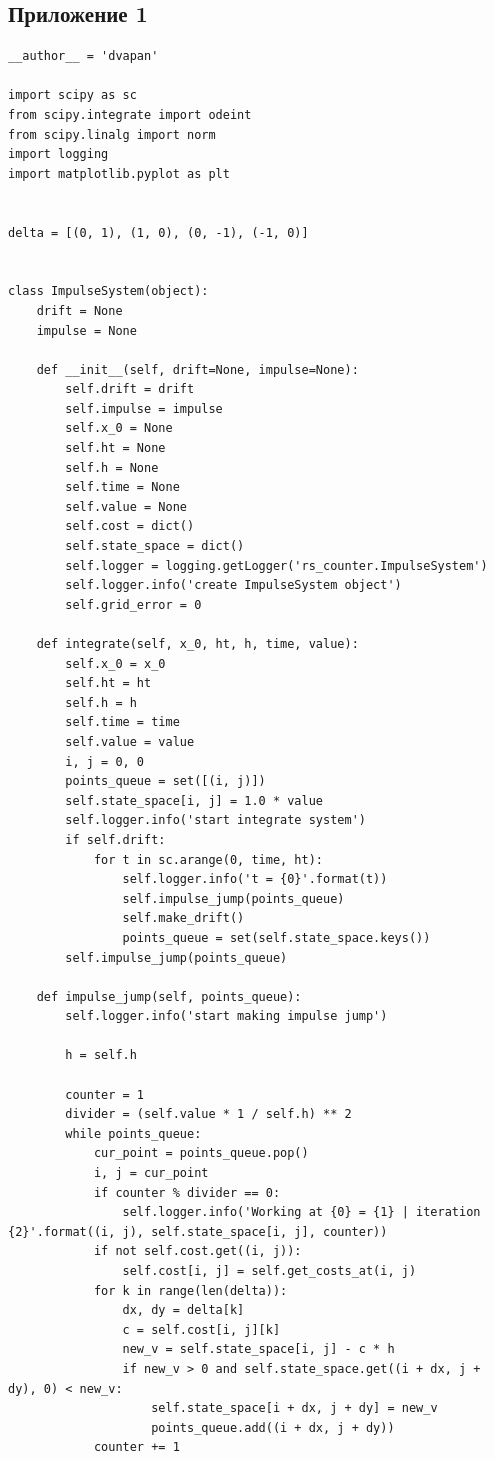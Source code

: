 \documentclass[a4paper,12pt]{article}
\begin{document}
\normalsize
\subsection*{Приложение 1}
\label{appl_src}

\begin{verbatim}
__author__ = 'dvapan'

import scipy as sc
from scipy.integrate import odeint
from scipy.linalg import norm
import logging
import matplotlib.pyplot as plt


delta = [(0, 1), (1, 0), (0, -1), (-1, 0)]


class ImpulseSystem(object):
    drift = None
    impulse = None

    def __init__(self, drift=None, impulse=None):
        self.drift = drift
        self.impulse = impulse
        self.x_0 = None
        self.ht = None
        self.h = None
        self.time = None
        self.value = None
        self.cost = dict()
        self.state_space = dict()
        self.logger = logging.getLogger('rs_counter.ImpulseSystem')
        self.logger.info('create ImpulseSystem object')
        self.grid_error = 0

    def integrate(self, x_0, ht, h, time, value):
        self.x_0 = x_0
        self.ht = ht
        self.h = h
        self.time = time
        self.value = value
        i, j = 0, 0
        points_queue = set([(i, j)])
        self.state_space[i, j] = 1.0 * value
        self.logger.info('start integrate system')
        if self.drift:
            for t in sc.arange(0, time, ht):
                self.logger.info('t = {0}'.format(t))
                self.impulse_jump(points_queue)
                self.make_drift()
                points_queue = set(self.state_space.keys())
        self.impulse_jump(points_queue)

    def impulse_jump(self, points_queue):
        self.logger.info('start making impulse jump')

        h = self.h

        counter = 1
        divider = (self.value * 1 / self.h) ** 2
        while points_queue:
            cur_point = points_queue.pop()
            i, j = cur_point
            if counter % divider == 0:
                self.logger.info('Working at {0} = {1} | iteration {2}'.format((i, j), self.state_space[i, j], counter))
            if not self.cost.get((i, j)):
                self.cost[i, j] = self.get_costs_at(i, j)
            for k in range(len(delta)):
                dx, dy = delta[k]
                c = self.cost[i, j][k]
                new_v = self.state_space[i, j] - c * h
                if new_v > 0 and self.state_space.get((i + dx, j + dy), 0) < new_v:
                    self.state_space[i + dx, j + dy] = new_v
                    points_queue.add((i + dx, j + dy))
            counter += 1


\end{verbatim}
\end{document}
